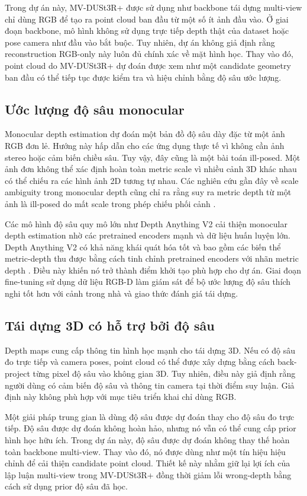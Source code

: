 \documentclass[12pt,a4paper]{article}
\newcommand{\mvdp}{MV-DUSt3R+}
\newcommand{\da}{Depth Anything V2}
\begin{document}
Trong dự án này, \mvdp{} được sử dụng như backbone tái dựng multi-view chỉ dùng RGB để tạo ra point cloud ban đầu từ một số ít ảnh đầu vào. Ở giai đoạn backbone, mô hình không sử dụng trực tiếp depth thật của dataset hoặc pose camera như đầu vào bắt buộc. Tuy nhiên, dự án không giả định rằng reconstruction RGB-only này luôn đủ chính xác về mặt hình học. Thay vào đó, point cloud do \mvdp{} dự đoán được xem như một candidate geometry ban đầu có thể tiếp tục được kiểm tra và hiệu chỉnh bằng độ sâu ước lượng.

\subsection{Ước lượng độ sâu monocular}
Monocular depth estimation dự đoán một bản đồ độ sâu dày đặc từ một ảnh RGB đơn lẻ. Hướng này hấp dẫn cho các ứng dụng thực tế vì không cần ảnh stereo hoặc cảm biến chiều sâu. Tuy vậy, đây cũng là một bài toán ill-posed. Một ảnh đơn không thể xác định hoàn toàn metric scale vì nhiều cảnh 3D khác nhau có thể chiếu ra các hình ảnh 2D tương tự nhau. Các nghiên cứu gần đây về scale ambiguity trong monocular depth cũng chỉ ra rằng suy ra metric depth từ một ảnh là ill-posed do mất scale trong phép chiếu phối cảnh \cite{rsa_depth}.

Các mô hình độ sâu quy mô lớn như \da{} cải thiện monocular depth estimation nhờ các pretrained encoders mạnh và dữ liệu huấn luyện lớn. \da{} có khả năng khái quát hóa tốt và bao gồm các biến thể metric-depth thu được bằng cách tinh chỉnh pretrained encoders với nhãn metric depth \cite{depthanything_project,depthanything_metric}. Điều này khiến nó trở thành điểm khởi tạo phù hợp cho dự án. Giai đoạn fine-tuning sử dụng dữ liệu RGB-D làm giám sát để bộ ước lượng độ sâu thích nghi tốt hơn với cảnh trong nhà và giao thức đánh giá tái dựng.

\subsection{Tái dựng 3D có hỗ trợ bởi độ sâu}
Depth maps cung cấp thông tin hình học mạnh cho tái dựng 3D. Nếu có độ sâu đo trực tiếp và camera poses, point cloud có thể được xây dựng bằng cách back-project từng pixel độ sâu vào không gian 3D. Tuy nhiên, điều này giả định rằng người dùng có cảm biến độ sâu và thông tin camera tại thời điểm suy luận. Giả định này không phù hợp với mục tiêu triển khai chỉ dùng RGB.

Một giải pháp trung gian là dùng độ sâu được dự đoán thay cho độ sâu đo trực tiếp. Độ sâu được dự đoán không hoàn hảo, nhưng nó vẫn có thể cung cấp prior hình học hữu ích. Trong dự án này, độ sâu được dự đoán không thay thế hoàn toàn backbone multi-view. Thay vào đó, nó được dùng như một tín hiệu hiệu chỉnh để cải thiện candidate point cloud. Thiết kế này nhằm giữ lại lợi ích của lập luận multi-view trong \mvdp{} đồng thời giảm lỗi wrong-depth bằng cách sử dụng prior độ sâu đã học.
\end{document}
